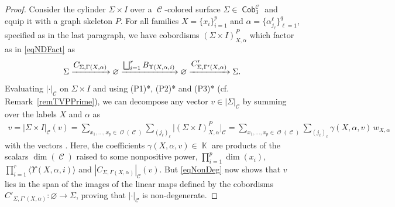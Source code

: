 \documentclass[10pt,a4paper]{amsart}
\DeclareMathOperator{\K}{\mathbb{K}}
\DeclareMathOperator{\Cob}{\mathsf{Cob}}
\DeclareMathOperator{\calc}{\mathcal{C}}
\DeclareMathOperator{\calo}{\mathcal{O}}
\numberwithin{equation}{section}
\theoremstyle{definition}
\begin{document}
\begin{proof}
 Consider the cylinder $\Sigma \times I$ over a $\calc$-colored surface $\Sigma \in \Cob_3^{\calc}$ and equip it with a graph skeleton $P$.
 For all families $X = \{x_i\}_{i = 1}^p$ and $\alpha = \{\alpha_{j_{\ell}}^{\ell}\}_{\ell = 1}^q$, specified as in the last paragraph, we have cobordisms $(\Sigma \times I)_{X, \alpha}^P$ which factor as in \eqref{eqNDFact} as
 \begin{align*}
 \Sigma \xrightarrow{\mbox{\normalsize$C_{\Sigma, \Gamma(X, \alpha)}$}} \varnothing \xrightarrow{\mbox{\normalsize$\bigsqcup_{i = 1}^rB_{\Upsilon(X, \alpha, i)}$}} \varnothing \xrightarrow{\mbox{\normalsize$C'_{\Sigma, \Gamma'(X, \alpha)}$}} \Sigma.
 \end{align*}
 Evaluating $|\cdot|_{\calc}$ on $\Sigma \times I$ and using (P1)*, (P2)* and (P3)* (cf. Remark~\ref{remTVPPrime}), we can decompose any vector $v \in |\Sigma|_{\calc}$ by summing over the labels $X$ and $\alpha$ as
 \begin{align}
 \label{eqNonDeg}
 v = |\Sigma \times I|_{\calc}(v) = \sum_{x_1, \dots, x_p \in \calo(\calc)} \sum_{(j_{\ell})_{\ell}}\bigl|(\Sigma \times I)_{X, \alpha}^P\bigr|_{\calc} = \sum_{x_1, \dots, x_p \in \calo(\calc)} \sum_{(j_{\ell})_{\ell}} \gamma(X, \alpha, v)\,w_{X, \alpha}
 \end{align}
 with the vectors \smash{$w_{X, \alpha} = |C'_{\Sigma, \Gamma'(X, \alpha)}|_{\calc}(1) \in |\Sigma|_{\calc}$}. Here, the coefficients $\gamma(X, \alpha, v) \in \K$ are products of the scalars $\dim(\calc)$ raised to some nonpositive power, $\prod_{i = 1}^p\dim(x_i)$, $\prod_{i = 1}^r\langle\Upsilon(X, \alpha, i)\rangle $ and $|C_{\Sigma, \Gamma(X, \alpha)}|_{\calc}(v)$. But \eqref{eqNonDeg} now shows that $v$ lies in the span of the images of the linear maps defined by the cobordisms $C'_{\Sigma, \Gamma'(X, \alpha)}\colon \varnothing \rightarrow \Sigma$, proving that $|\cdot|_{\calc}$ is non-degenerate.
\end{proof}
\end{document}

